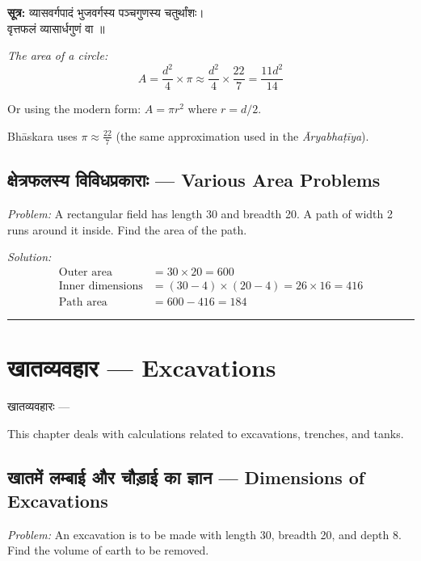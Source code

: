 \documentclass[11pt,a4paper]{book}
\newcommand{\longline}{\noindent\rule{\textwidth}{0.4pt}}
\newenvironment{sanskritverse}{
  \begin{center}
  \begin{minipage}{0.92\textwidth}
  \devanagarifont
  \centering
}{
  \end{minipage}
  \end{center}
  \vspace{0.5em}
}
\begin{document}
\begin{sanskritverse}
\textbf{सूत्र:} व्यासवर्गपादं भुजवर्गस्य पञ्चगुणस्य चतुर्थांशः।\\
वृत्तफलं व्यासार्धगुणं वा ॥
\end{sanskritverse}

\textit{The area of a circle:}
\[
A = \frac{d^2}{4} \times \pi \approx \frac{d^2}{4} \times \frac{22}{7} = \frac{11 d^2}{14}
\]

Or using the modern form: $A = \pi r^2$ where $r = d/2$.

Bhāskara uses $\pi \approx \frac{22}{7}$ (the same approximation used in the \textit{Āryabhaṭīya}).

\section{क्षेत्रफलस्य विविधप्रकाराः — Various Area Problems}

\textit{Problem:} A rectangular field has length 30 and breadth 20. A path of width 2 runs around it inside. Find the area of the path.

\textit{Solution:}
\begin{align*}
\text{Outer area} &= 30 \times 20 = 600 \\
\text{Inner dimensions} &= (30-4) \times (20-4) = 26 \times 16 = 416 \\
\text{Path area} &= 600 - 416 = 184
\end{align*}

\longline

\chapter{खातव्यवहार — Excavations}
\label{chap:khata}

\begin{sanskritverse}
खातव्यवहारः —
\end{sanskritverse}

This chapter deals with calculations related to excavations, trenches, and tanks.

\section{खातमें लम्बाई और चौड़ाई का ज्ञान — Dimensions of Excavations}

\textit{Problem:} An excavation is to be made with length 30, breadth 20, and depth 8. Find the volume of earth to be removed.
\end{document}
